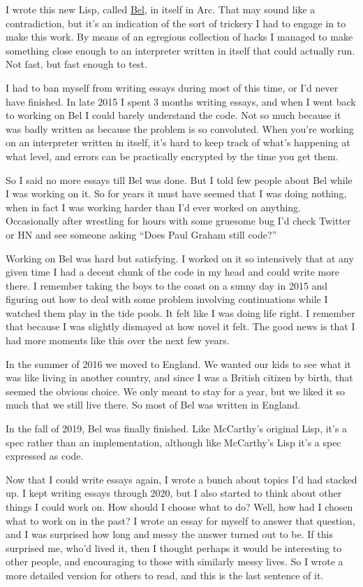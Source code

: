 \documentclass[12pt]{book}
\begin{document}
I wrote this new Lisp, called \href{bel.html}{Bel}, in itself in Arc.
That may sound like a contradiction, but it's an indication of the sort
of trickery I had to engage in to make this work. By means of an
egregious collection of hacks I managed to make something close enough
to an interpreter written in itself that could actually run. Not fast,
but fast enough to test.

I had to ban myself from writing essays during most of this time, or I'd
never have finished. In late 2015 I spent 3 months writing essays, and
when I went back to working on Bel I could barely understand the code.
Not so much because it was badly written as because the problem is so
convoluted. When you're working on an interpreter written in itself,
it's hard to keep track of what's happening at what level, and errors
can be practically encrypted by the time you get them.

So I said no more essays till Bel was done. But I told few people about
Bel while I was working on it. So for years it must have seemed that I
was doing nothing, when in fact I was working harder than I'd ever
worked on anything. Occasionally after wrestling for hours with some
gruesome bug I'd check Twitter or HN and see someone asking ``Does Paul
Graham still code?''

Working on Bel was hard but satisfying. I worked on it so intensively
that at any given time I had a decent chunk of the code in my head and
could write more there. I remember taking the boys to the coast on a
sunny day in 2015 and figuring out how to deal with some problem
involving continuations while I watched them play in the tide pools. It
felt like I was doing life right. I remember that because I was slightly
dismayed at how novel it felt. The good news is that I had more moments
like this over the next few years.

In the summer of 2016 we moved to England. We wanted our kids to see
what it was like living in another country, and since I was a British
citizen by birth, that seemed the obvious choice. We only meant to stay
for a year, but we liked it so much that we still live there. So most of
Bel was written in England.

In the fall of 2019, Bel was finally finished. Like McCarthy's original
Lisp, it's a spec rather than an implementation, although like
McCarthy's Lisp it's a spec expressed as code.

Now that I could write essays again, I wrote a bunch about topics I'd
had stacked up. I kept writing essays through 2020, but I also started
to think about other things I could work on. How should I choose what to
do? Well, how had I chosen what to work on in the past? I wrote an essay
for myself to answer that question, and I was surprised how long and
messy the answer turned out to be. If this surprised me, who'd lived it,
then I thought perhaps it would be interesting to other people, and
encouraging to those with similarly messy lives. So I wrote a more
detailed version for others to read, and this is the last sentence of
it.
\end{document}
